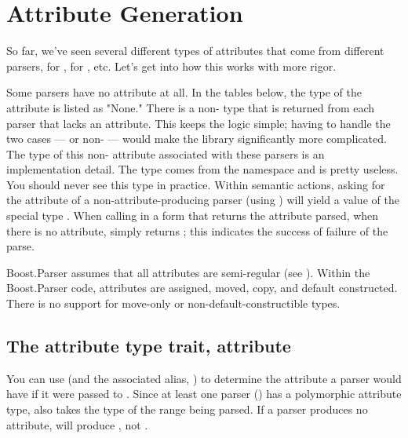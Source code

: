 \documentclass{MyBook}
\begin{document}
\section{Attribute Generation}

So far, we've seen several different types of attributes that come from different parsers,  for ,  for , etc. Let's get into how this works with more rigor.

\begin{marker}[title=Note ]
Some parsers have no attribute at all. In the tables below, the type of the attribute is listed as "None." There is a non- type that is returned from each parser that lacks an attribute. This keeps the logic simple; having to handle the two cases ---  or non- --- would make the library significantly more complicated. The type of this non- attribute associated with these parsers is an implementation detail. The type comes from the  namespace and is pretty useless. You should never see this type in practice. Within semantic actions, asking for the attribute of a non-attribute-producing parser (using ) will yield a value of the special type . When calling  in a form that returns the attribute parsed, when there is no attribute, simply returns ; this indicates the success of failure of the parse. 
\end{marker}

\begin{marker}[title=Warning ]
Boost.Parser assumes that all attributes are semi-regular (see ). Within the Boost.Parser code, attributes are assigned, moved, copy, and default constructed. There is no support for move-only or non-default-constructible types. 
\end{marker}

\subsection{The attribute type trait, attribute}

You can use  (and the associated alias, ) to determine the attribute a parser would have if it were passed to . Since at least one parser () has a polymorphic attribute type,  also takes the type of the range being parsed. If a parser produces no attribute,  will produce , not .
\end{document}
